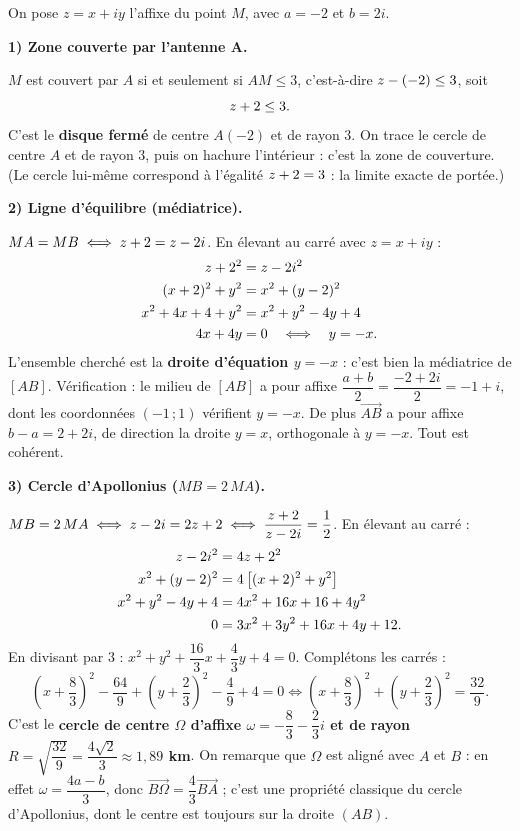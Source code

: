 \documentclass[11pt]{article}
\providecommand{\abs}{}\let\abs\relax\DeclarePairedDelimiter{\abs}{\lvert}{\rvert}
\newcounter{popsec}
\newcounter{popsub}
\newcommand{\courssub}[1]{%
  \stepcounter{popsub}%
  \par\vspace{9pt}\noindent{\popxbold\fontsize{11.5}{13}\selectfont\color{popink}{\color{poporange}\thepopsec.\thepopsub}\hspace{6pt}#1}\par\nopagebreak\vspace{4pt}
}
\begin{document}
\courssub{Démarche et corrigé commenté}

\begin{exoresolu}
On pose $z = x+iy$ l'affixe du point $M$, avec $a=-2$ et $b=2i$.

\textbf{1) Zone couverte par l'antenne A.}

$M$ est couvert par $A$ si et seulement si $AM \leq 3$, c'est-à-dire $\abs{z-(-2)}\leq 3$, soit
\[ \abs{z+2}\leq 3. \]
C'est le \textbf{disque fermé} de centre $A(-2)$ et de rayon $3$. On trace le cercle de centre $A$ et de rayon $3$, puis on hachure l'intérieur : c'est la zone de couverture. (Le cercle lui-même correspond à l'égalité $\abs{z+2}=3$ : la limite exacte de portée.)

\textbf{2) Ligne d'équilibre (médiatrice).}

$MA = MB \iff \abs{z+2} = \abs{z-2i}$. En élevant au carré avec $z=x+iy$ :
\begin{align*}
\abs{z+2}^2 &= \abs{z-2i}^2\\
(x+2)^2 + y^2 &= x^2 + (y-2)^2\\
x^2 + 4x + 4 + y^2 &= x^2 + y^2 - 4y + 4\\
4x + 4y &= 0 \quad\Longleftrightarrow\quad y = -x.
\end{align*}
L'ensemble cherché est la \textbf{droite d'équation $y=-x$} : c'est bien la médiatrice de $[AB]$. Vérification : le milieu de $[AB]$ a pour affixe $\dfrac{a+b}{2} = \dfrac{-2+2i}{2} = -1+i$, dont les coordonnées $(-1\,;1)$ vérifient $y=-x$. De plus $\overrightarrow{AB}$ a pour affixe $b-a = 2+2i$, de direction la droite $y=x$, orthogonale à $y=-x$. Tout est cohérent.

\textbf{3) Cercle d'Apollonius ($MB = 2\,MA$).}

$MB = 2\,MA \iff \abs{z-2i} = 2\abs{z+2} \iff \abs{\dfrac{z+2}{z-2i}} = \dfrac{1}{2}$. En élevant au carré :
\begin{align*}
\abs{z-2i}^2 &= 4\abs{z+2}^2\\
x^2 + (y-2)^2 &= 4\left[(x+2)^2 + y^2\right]\\
x^2 + y^2 - 4y + 4 &= 4x^2 + 16x + 16 + 4y^2\\
0 &= 3x^2 + 3y^2 + 16x + 4y + 12.
\end{align*}
En divisant par $3$ : $x^2 + y^2 + \dfrac{16}{3}x + \dfrac{4}{3}y + 4 = 0$. Complétons les carrés :
\[ \left(x+\dfrac{8}{3}\right)^2 - \dfrac{64}{9} + \left(y+\dfrac{2}{3}\right)^2 - \dfrac{4}{9} + 4 = 0
\iff \left(x+\dfrac{8}{3}\right)^2 + \left(y+\dfrac{2}{3}\right)^2 = \dfrac{32}{9}. \]
C'est le \textbf{cercle de centre $\Omega$ d'affixe $\omega = -\dfrac{8}{3}-\dfrac{2}{3}i$ et de rayon $R = \sqrt{\dfrac{32}{9}} = \dfrac{4\sqrt{2}}{3} \approx 1{,}89$ km}. On remarque que $\Omega$ est aligné avec $A$ et $B$ : en effet $\omega = \dfrac{4a - b}{3}$, donc $\overrightarrow{B\Omega} = \dfrac{4}{3}\overrightarrow{BA}$ ; c'est une propriété classique du cercle d'Apollonius, dont le centre est toujours sur la droite $(AB)$.


\end{exoresolu}
\end{document}
